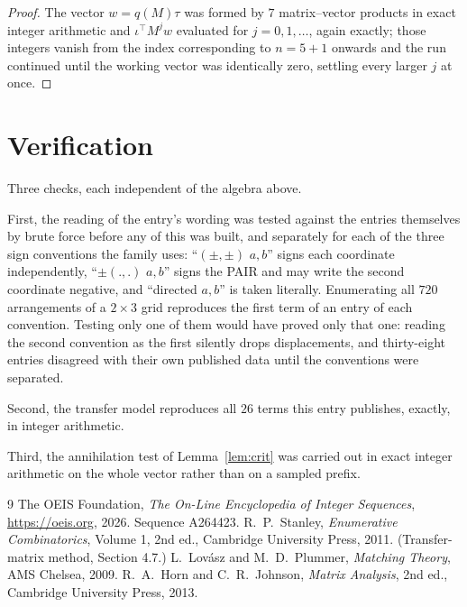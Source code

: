 \documentclass[11pt,a4paper]{article}
\theoremstyle{plain}
\theoremstyle{definition}
\begin{document}
\begin{proof}
The vector $w=q(M)\tau$ was formed by $7$ matrix--vector products in exact integer
arithmetic and $\iota^{\!\top}M^{j}w$ evaluated for $j=0,1,\dots$, again exactly; those
integers vanish from the index corresponding to $n=5+1$ onwards and the run continued
until the working vector was identically zero, settling every larger $j$ at once.
\end{proof}

\section{Verification}

Three checks, each independent of the algebra above.

First, the reading of the entry's wording was tested against the entries themselves by brute
force before any of this was built, and separately for each of the three sign conventions the
family uses: ``$(\pm,\pm)$ $a,b$'' signs each coordinate independently, ``$\pm(.,.)$ $a,b$''
signs the PAIR and may write the second coordinate negative, and ``directed $a,b$'' is taken
literally. Enumerating all $720$ arrangements of a $2\times3$ grid reproduces the first term
of an entry of each convention. Testing only one of them would have proved only that one:
reading the second convention as the first silently drops displacements, and thirty-eight
entries disagreed with their own published data until the conventions were separated.

Second, the transfer model reproduces all $26$ terms this entry publishes, exactly, in
integer arithmetic.

Third, the annihilation test of Lemma~\ref{lem:crit} was carried out in exact integer
arithmetic on the whole vector rather than on a sampled prefix.

\begin{thebibliography}{9}
 The OEIS Foundation, \emph{The On-Line Encyclopedia of Integer
Sequences}, \url{https://oeis.org}, 2026. Sequence A264423.
 R.~P.~Stanley, \emph{Enumerative Combinatorics}, Volume 1, 2nd ed.,
Cambridge University Press, 2011. (Transfer-matrix method, Section 4.7.)
 L.~Lov\'asz and M.~D.~Plummer, \emph{Matching Theory}, AMS Chelsea, 2009.
 R.~A.~Horn and C.~R.~Johnson, \emph{Matrix Analysis}, 2nd ed., Cambridge
University Press, 2013.
\end{thebibliography}
\end{document}
